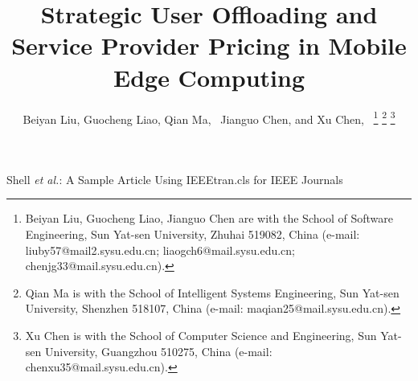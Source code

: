 \documentclass[lettersize,journal]{IEEEtran}
\begin{document}
\title{Strategic User Offloading and Service Provider Pricing in Mobile Edge Computing}

\author{Beiyan Liu, Guocheng Liao, Qian Ma,~ Jianguo Chen, and Xu Chen,~
\thanks{Beiyan Liu, Guocheng Liao, Jianguo Chen are with the School of Software Engineering, Sun Yat-sen University, Zhuhai 519082, China (e-mail: liuby57@mail2.sysu.edu.cn; liaogch6@mail.sysu.edu.cn; chenjg33@mail.sysu.edu.cn).}
\thanks{Qian Ma is with the School of Intelligent Systems Engineering, Sun Yat-sen University, Shenzhen 518107, China (e-mail: maqian25@mail.sysu.edu.cn).}%
\thanks{Xu Chen is with the School of Computer Science and Engineering, Sun Yat-sen University, Guangzhou 510275, China (e-mail: chenxu35@mail.sysu.edu.cn).}%
}

%
{Shell \MakeLowercase{\textit{et al.}}: A Sample Article Using IEEEtran.cls for IEEE Journals}


\maketitle
\end{document}
